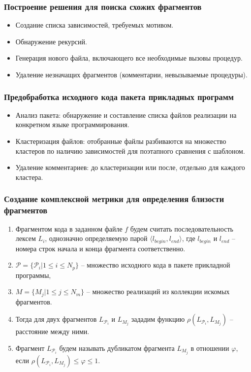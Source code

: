\documentclass{beamer}
\begin{document}
\begin{frame}
\frametitle{Построение решения для поиска схожих фрагментов}
\begin{itemize}
	\item Создание списка зависимостей, требуемых мотивом.
	\item Обнаружение рекурсий.
	\item Генерация нового файла, включающего все необходимые вызовы процедур.
	\item Удаление незначащих фрагментов (комментарии, невызываемые процедуры).
\end{itemize}
\end{frame}

\begin{frame}
\frametitle{Предобработка исходного кода пакета прикладных программ}
\begin{itemize}
	\item Анализ пакета: обнаружение и составление списка файлов реализации на
	 конкретном языке программирования.
	\item Кластеризация файлов: отобранные файлы разбиваются на множество кластеров
по наличию зависимостей для поэтапного сравнения с шаблоном.
	\item Удаление комментариев: до кластеризации или после,
отдельно для каждого кластера.
\end{itemize}
\end{frame}



\begin{frame}
\frametitle{Создание комплексной метрики для определения близости фрагментов}
\begin{enumerate}
	\item Фрагментом кода в заданном файле $f$ будем считать последовательность лексем $L_i$, однозначно определяемую парой $\langle l_{begin}, l_{end}\rangle$, где $l_{begin}$ и $l_{end}$ -- номера строк начала и конца фрагмента соответственно.
	
	\item $\mathcal{P} = \{\mathcal{P}_i | 1 \leq i \leq N_p \}$ -- множество  исходного кода в пакете прикладной программы, 
	
	\item $ M = \{M_j | 1 \leq j \leq N_m \}$ -- множество реализаций из коллекции искомых фрагментов.	
	
	\item Тогда для двух фрагментов $L_{\mathcal{P}_i}$ и $L_{M_j}$ зададим функцию $\rho (L_{\mathcal{P}_i}, L_{M_j})$ -- расстояние между ними.
	\item Фрагмент $L_{\mathcal{P}_i}$ будем называть дубликатом фрагмента $L_{M_j}$ в отношении $ \varphi$, если $\rho (L_{\mathcal{P}_i}, L_{M_j}) \leq \varphi \leq 1$.
\end{enumerate}
\end{frame}
\end{document}
